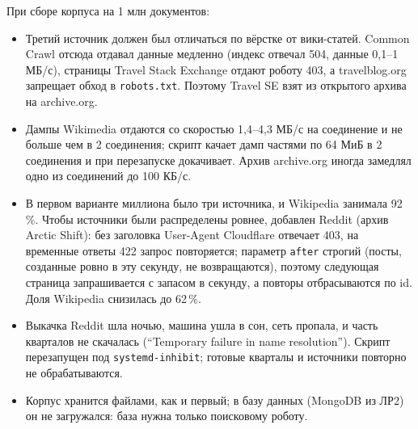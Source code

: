 При сборе корпуса на 1 млн документов:
\begin{itemize}
    \item Третий источник должен был отличаться по вёрстке от вики-статей. Common Crawl отсюда отдавал данные медленно (индекс отвечал 504, данные 0,1--1 МБ/с), страницы Travel Stack Exchange отдают роботу 403, а travelblog.org запрещает обход в \texttt{robots.txt}. Поэтому Travel SE взят из открытого архива на archive.org.
    \item Дампы Wikimedia отдаются со скоростью 1,4--4,3 МБ/с на соединение и не больше чем в 2 соединения; скрипт качает дамп частями по 64 МиБ в 2 соединения и при перезапуске докачивает. Архив archive.org иногда замедлял одно из соединений до 100 КБ/с.
    \item В первом варианте миллиона было три источника, и Wikipedia занимала 92\,\%. Чтобы источники были распределены ровнее, добавлен Reddit (архив Arctic Shift): без заголовка User-Agent Cloudflare отвечает 403, на временные ответы 422 запрос повторяется; параметр \texttt{after} строгий (посты, созданные ровно в эту секунду, не возвращаются), поэтому следующая страница запрашивается с запасом в секунду, а повторы отбрасываются по id. Доля Wikipedia снизилась до 62\,\%.
    \item Выкачка Reddit шла ночью, машина ушла в сон, сеть пропала, и часть кварталов не скачалась (\enquote{Temporary failure in name resolution}). Скрипт перезапущен под \texttt{systemd-inhibit}; готовые кварталы и источники повторно не обрабатываются.
    \item Корпус хранится файлами, как и первый; в базу данных (MongoDB из ЛР2) он не загружался: база нужна только поисковому роботу.
\end{itemize}

\pagebreak
